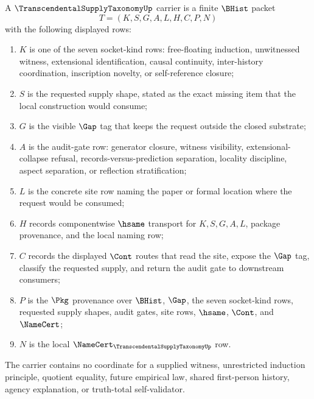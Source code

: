 \begin{definition}
\label{def:transcendental-supply-taxonomy-carrier}
A $\TranscendentalSupplyTaxonomyUp$ carrier is a finite $\BHist$ packet
$$
T=(K,S,G,A,L,H,C,P,N)
$$
with the following displayed rows:
\begin{enumerate}
\item $K$ is one of the seven socket-kind rows: free-floating induction, unwitnessed witness, extensional identification, causal continuity, inter-history coordination, inscription novelty, or self-reference closure;
\item $S$ is the requested supply shape, stated as the exact missing item that the local construction would consume;
\item $G$ is the visible $\Gap$ tag that keeps the request outside the closed substrate;
\item $A$ is the audit-gate row: generator closure, witness visibility, extensional-collapse refusal, records-versus-prediction separation, locality discipline, aspect separation, or reflection stratification;
\item $L$ is the concrete site row naming the paper or formal location where the request would be consumed;
\item $H$ records componentwise $\hsame$ transport for $K,S,G,A,L$, package provenance, and the local naming row;
\item $C$ records the displayed $\Cont$ routes that read the site, expose the $\Gap$ tag, classify the requested supply, and return the audit gate to downstream consumers;
\item $P$ is the $\Pkg$ provenance over $\BHist$, $\Gap$, the seven socket-kind rows, requested supply shapes, audit gates, site rows, $\hsame$, $\Cont$, and $\NameCert$;
\item $N$ is the local $\NameCert_{\TranscendentalSupplyTaxonomyUp}$ row.
\end{enumerate}
The carrier contains no coordinate for a supplied witness, unrestricted induction principle, quotient equality, future empirical law, shared first-person history, agency explanation, or truth-total self-validator.
\end{definition}

